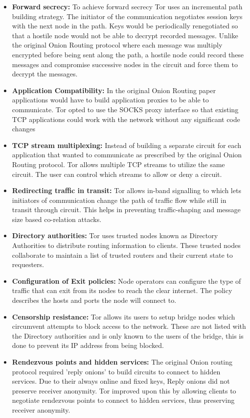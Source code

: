 \documentclass{llncs}
\begin{document}
\begin{itemize}
	\item[]{\textbf{Forward secrecy:} To achieve forward secrecy Tor uses an incremental path building strategy. The initiator of the communication negotiates session keys with the next node in the path. Keys would be periodically renegotiated so that a hostile node would not be able to decrypt recorded messages. Unlike the original Onion Routing protocol where each message was multiply encrypted before being sent along the path, a hostile node could record these messages and compromise successive nodes in the circuit and force them to decrypt the messages.}
	\item[]{\textbf{Application Compatibility:} In the original Onion Routing paper applications would have to build application proxies to be able to communicate. Tor opted to use the SOCKS proxy interface so that existing TCP applications could work with the network without any significant code changes}
	\item[]{\textbf{TCP stream multiplexing:} Instead of building a separate circuit for each application that wanted to communicate as prescribed by the original Onion Routing protocol. Tor allows multiple TCP streams to utilize the same circuit. The user can control which streams to allow or deny a circuit.}
	\item[]{\textbf{Redirecting traffic in transit:} Tor allows in-band signalling to which lets initiators of communication change the path of traffic flow while still in transit through circuit. This helps in preventing traffic-shaping and message size based co-relation attacks.}
	\item[]{\textbf{Directory authorities:} Tor uses trusted nodes known as Directory Authorities to distribute routing information to clients. These trusted nodes collaborate to maintain a list of trusted routers and their current state to requesters.}
	\item[]{\textbf{Configuration of Exit policies:} Node operators can configure the type of traffic that can exit from its nodes to reach the clear internet. The policy describes the hosts and ports the node will connect to.}
	\item[]{\textbf{Censorship resistance:} Tor allows its users to setup bridge nodes which circumvent attempts to block access to the network. These are not listed with the Directory authorities and is only known to the users of the bridge, this is done to prevent its IP address from being blocked.}
		\item[]{\textbf{Rendezvous points and hidden services:} The original Onion routing protocol required 'reply onions' to build circuits to connect to hidden services. Due to their always online and fixed keys, Reply onions did not preserve receiver anonymity. Tor improved upon this by allowing clients to negotiate rendezvous points to connect to hidden services, thus preserving receiver anonymity.}
\end{itemize}
\end{document}
